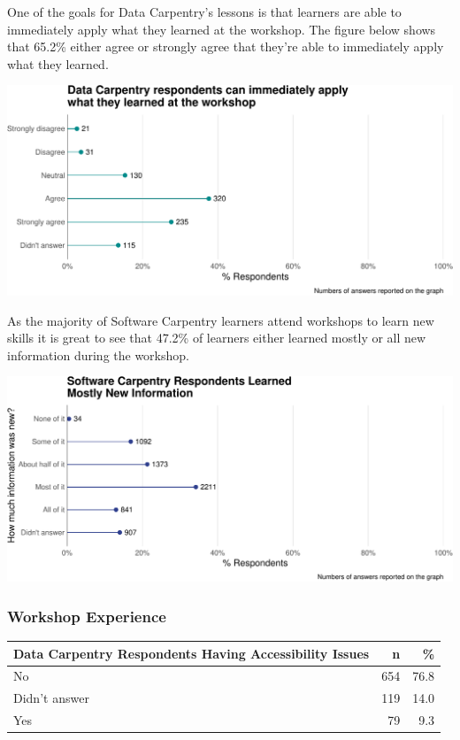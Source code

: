 \documentclass[]{article}
\begin{document}
One of the goals for Data Carpentry's lessons is that learners are able
to immediately apply what they learned at the workshop. The figure below
shows that 65.2\% either agree or strongly agree that they're able to
immediately apply what they learned.

\includegraphics[width=720]{figures/dc-skill-applicability-plot-1}

As the majority of Software Carpentry learners attend workshops to learn
new skills it is great to see that 47.2\% of learners either learned
mostly or all new information during the workshop.

\includegraphics[width=720]{figures/swc-new-information-plot-1}

\subsubsection{Workshop Experience}\label{workshop-experience}

\begin{longtable}[]{@{}lrr@{}}
\toprule
Data Carpentry Respondents Having Accessibility Issues & n &
\%\tabularnewline
\midrule
\endhead
No & 654 & 76.8\tabularnewline
Didn't answer & 119 & 14.0\tabularnewline
Yes & 79 & 9.3\tabularnewline
\bottomrule
\end{longtable}
\end{document}
